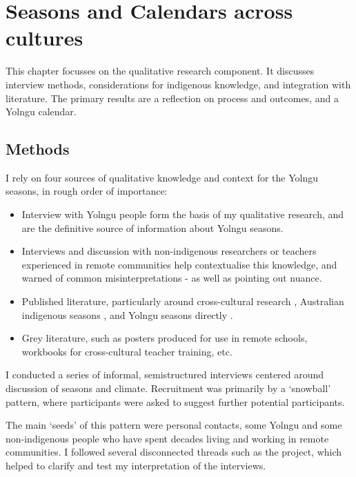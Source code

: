 \chapter{Seasons and Calendars across cultures}
\label{ch:seasons}

This chapter focusses on the qualitative research component.
It discusses interview methods, considerations for indigenous knowledge,
and integration with literature.  The primary results are a reflection
on process and outcomes, and a Yolngu calendar.


\section{Methods}

I rely on four sources of qualitative knowledge and context for the Yolngu
seasons, in rough order of importance:

\begin{itemize}
\item Interview with Yolngu people form the basis of my qualitative research, and
        are the definitive source of information about Yolngu seasons.
\item Interviews and discussion with non-indigenous researchers or teachers experienced
        in remote communities help contextualise this knowledge, and warned of
        common misinterpretations - as well as pointing out nuance.
\item Published literature, particularly around cross-cultural research \citep[eg.][]{smith1999},
        Australian indigenous seasons \citep[eg.][]{prober2011,oconnor2010}, and Yolngu
        seasons directly \citep{davis1989}.
\item Grey literature, such as posters produced for use in remote schools, workbooks
        for cross-cultural teacher training, etc.
\end{itemize}


I conducted a series of informal, semistructured interviews centered around
discussion of seasons and climate. Recruitment was primarily by a `snowball'
pattern, where participants were asked to suggest further potential participants.

The main `seeds' of this pattern were personal contacts, some Yolngu and some
non-indigenous people who have spent decades living and working in remote
communities. I followed several disconnected threads such as the
\citet{CSIROcals} project, which helped to clarify and test my interpretation
of the interviews.

